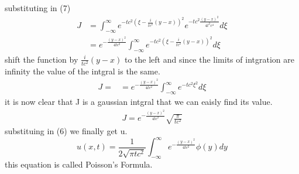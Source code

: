\documentclass[]{article}
\begin{document}
substituting in (7)
\begin{align*}
J   &= \int_{-\infty}^{\infty}e^{-tc^2{(\xi-\frac{i}{tc^2}(y-x))}^2}e^{-tc^2\frac{{(y-x)}^2}{4t^2 c^4}} d\xi
\\
    &=e^{-\frac{{(y-x)}^2}{4tc^2}} \int_{-\infty}^{\infty}e^{-tc^2{(\xi-\frac{i}{tc^2}(y-x))}^2} d\xi
\end{align*}
shift the function by $\frac{i}{tc^2}(y-x)$ to the left and since the limits of intgration are infinity the value of the intgral is the same.
\begin{align*}
J = &=e^{-\frac{{(y-x)}^2}{4tc^2}} \int_{-\infty}^{\infty}e^{-tc^2\xi^2} d\xi
\end{align*}
it is now clear that J is a gaussian intgral that we can eaisly find its value.
\begin{align*}
J = e^{-\frac{{(y-x)}^2}{4tc^2}}\sqrt{\frac{\pi}{tc^2}}
\end{align*}
substituing in (6) we finally get u.
\[
    u(x,t) = \frac{1}{2\sqrt{\pi tc^2}}\int_{-\infty}^{\infty}e^{-\frac{{(y-x)}^2}{4tc^2}} \phi(y)dy    
\]
this equation is called Poisson's Formula.
\end{document}
